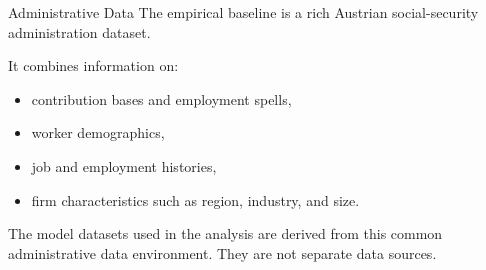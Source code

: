 \documentclass[10pt]{beamer}
\begin{document}

\begin{frame}{Administrative Data}
The empirical baseline is a rich Austrian social-security administration dataset.

\vspace{0.3cm}
It combines information on:
\begin{itemize}
    \item contribution bases and employment spells,
    \item worker demographics,
    \item job and employment histories,
    \item firm characteristics such as region, industry, and size.
\end{itemize}

\vspace{0.3cm}
The model datasets used in the analysis are derived from this common administrative data environment. They are not separate data sources.
\end{frame}
\end{document}
